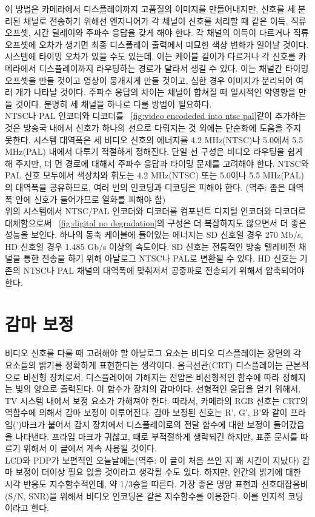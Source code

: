 이 방법은 카메라에서 디스플레이까지 고품질의 이미지를 만들어내지만, 신호를 세 분리된 채널로 전송하기 위해선 엔지니어가 각 채널이 신호를 처리할 때 같은 이득, 직류 오프셋, 시간 딜레이와 주파수 응답을 갖게 해야 한다.
각 채널의 이득이 다르거나 직류 오프셋에 오차가 생기면 최종 디스플레이 출력에서 미묘한 색상 변화가 일어날 것이다.
시스템에 타이밍 오차가 있을 수도 있는데, 이는 케이블 길이가 다르거나 각 신호를 카메라에서 디스플레이까지 라우팅하는 경로가 달라서 생길 수 있다.
이는 채널간 타이밍 오프셋을 만들 것이고 영상이 뭉개지게 만들 것이고, 심한 경우 이미지가 분리되어 여러 개가 나타날 것이다.
주파수 응답의 차이는 채널이 합쳐질 때 일시적인 악영향을 만들 것이다.
분명히 세 채널을 하나로 다룰 방법이 필요하다.
\\
NTSC나 PAL 인코더와 디코더를 \figurename~\ref{fig:video encodeded into ntsc pal}\와 같이 추가하는 것은 방송국 내에서 신호가 하나의 선으로 다뤄지는 것 외에는 단순화에 도움을 주지 못한다.
시스템 대역폭은 세 비디오 신호의 에너지를 4.2 MHz(NTSC)나 5.0에서 5.5 MHz(PAL) 내에서 다루기 적절하게 정해진다.
단일 선 구성은 비디오 라우팅을 쉽게 해 주지만, 더 먼 경로에 대해서 주파수 응답과 타이밍 문제를 고려해야 한다.
NTSC와 PAL 신호 모두에서 색상차와 휘도는 4.2 MHz(NTSC) 또는 5.0이나 5.5 MHz(PAL)의 대역폭을 공유하므로, 여러 번의 인코딩과 디코딩은 피해야 한다.
(역주: 좁은 대역폭 안에 신호가 들어가므로 열화를 피해야 함)
\\
위의 시스템에서 NTSC/PAL 인코더와 디코더를 컴포넌트 디지털 인코더와 디코더로 대체함으로써 \figurename~\ref{fig:digital no degradation}의 구성은 더 복잡하지도 않으면서 더 좋은 성능을 보인다.
하나의 동축 케이블에 들어있는 에너지는 SD 신호일 경우 270 Mb/s, HD 신호일 경우 1.485 Gb/s 이상의 속도이다.
SD 신호는 전통적인 방송 텔레비전 채널을 통한 전송을 하기 위해 아날로그 NTSC나 PAL로 변환될 수 있다.
HD 신호는 기존의 NTSC나 PAL 채널의 대역폭에 맞춰져서 공중파로 전송되기 위해서 압축되어야 한다.

\section{감마 보정}
비디오 신호를 다룰 때 고려해야 할 아날로그 요소는 비디오 디스플레이는 장면의 각 요소들의 밝기를 정확하게 표현한다는 생각이다.
음극선관(CRT) 디스플레이는 근본적으로 비선형 장치로서, 디스플레이에 가해지는 전압은 비선형적인 함수에 따라 정해지는 빛의 양으로 출력된다.
이 함수가 장치의 감마이다. 선형적인 응답을 얻기 위해서, TV 시스템 내에서 보정 요소가 가해져야 한다.
따라서, 카메라의 RGB 신호는 CRT의 역함수에 의해서 감마 보정이 이루어진다. 감마 보정된 신호는 R', G', B'와 같이 프라임(')마크가 붙어서 감지 장치에서 디스플레이로의 전달 함수에 대한 보정이 들어갔음을 나타낸다.
프라임 마크가 귀찮고, 때로 부적절하게 생략되긴 하지만, 표준 문서를 따르기 위해서 이 글에서 계속 사용될 것이다.
\\
LCD와 PDP가 보편적인 오늘날에는(역주: 이 글이 처음 쓰인 지 꽤 시간이 지났다) 감마 보정이 더이상 필요 없을 것이라고 생각될 수도 있다.
하지만, 인간의 밝기에 대한 시각 반응도 지수함수적인데, 약 1/3승을 따른다. 가장 좋은 명암 표현과 신호대잡음비(S/N, SNR)을 위해서 비디오 인코딩은 같은 지수함수를 이용한다. 이를 인지적 코딩이라고 한다.

